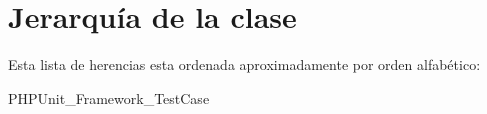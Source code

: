\section{Jerarquía de la clase}
Esta lista de herencias esta ordenada aproximadamente por orden alfabético\-:\begin{DoxyCompactList}
\item {}
\item P\-H\-P\-Unit\-\_\-\-Framework\-\_\-\-Test\-Case\begin{DoxyCompactList}
\item {}
\end{DoxyCompactList}
\end{DoxyCompactList}
